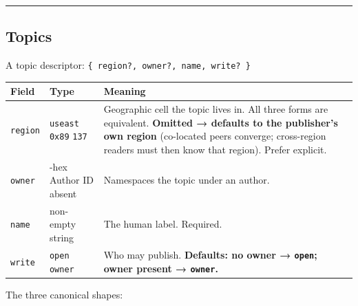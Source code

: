 \documentclass[
  nobib]{tufte-handout}
\newcounter{none} %
\begin{document}
\begin{center}\rule{0.5\linewidth}{0.5pt}\end{center}

\subsection{Topics}\label{topics}

A topic descriptor: \texttt{\{\ region?,\ owner?,\ name,\ write?\ \}}

{\def\LTcaptype{none} %
\begin{longtable}[]{@{}
  >{\raggedright\arraybackslash}p{}
  >{\raggedright\arraybackslash}p{}
  >{\raggedright\arraybackslash}p{}@{}}
\toprule\noalign{}
\begin{minipage}[b]{\linewidth}\raggedright
Field
\end{minipage} & \begin{minipage}[b]{\linewidth}\raggedright
Type
\end{minipage} & \begin{minipage}[b]{\linewidth}\raggedright
Meaning
\end{minipage} \\
\midrule\noalign{}
\endhead
\bottomrule\noalign{}
\endlastfoot
\texttt{region} & \texttt{\textquotesingle{}useast\textquotesingle{}}
\textbar{} \texttt{\textquotesingle{}0x89\textquotesingle{}} \textbar{}
\texttt{137} & Geographic cell the topic lives in. All three forms are
equivalent. \textbf{Omitted → defaults to the publisher's own region}
(co-located peers converge; cross-region readers must then know that
region). Prefer explicit. \\
\texttt{owner} & 64-hex Author ID \textbar{} absent & Namespaces the
topic under an author. \\
\texttt{name} & non-empty string & The human label. Required. \\
\texttt{write} & \texttt{\textquotesingle{}open\textquotesingle{}}
\textbar{} \texttt{\textquotesingle{}owner\textquotesingle{}} & Who may
publish. \textbf{Defaults: no owner →
\texttt{\textquotesingle{}open\textquotesingle{}}; owner present →
\texttt{\textquotesingle{}owner\textquotesingle{}}.} \\
\end{longtable}
}

The three canonical shapes:
\end{document}
